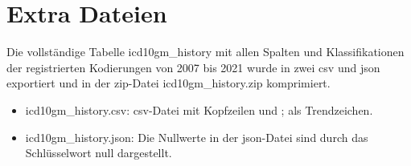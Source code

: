 \chapter{Extra Dateien} \label{ch:extrafiles}

 Die vollständige Tabelle \textsf{icd10gm\_history} mit allen Spalten und Klassifikationen der registrierten Kodierungen von 2007 bis 2021 wurde in zwei \ac{csv} und \ac{json} exportiert und in der \ac{zip}-Datei \textsf{icd10gm\_history.zip} komprimiert.
 
 \begin{itemize}
 	\item \textsf{icd10gm\_history.csv}: \ac{csv}-Datei mit Kopfzeilen und \glqq ;\grqq{} als Trendzeichen.
 	\item \textsf{icd10gm\_history.json}: Die Nullwerte in der \ac{json}-Datei sind durch das Schlüsselwort \textsf{null} dargestellt.
 \end{itemize} 
